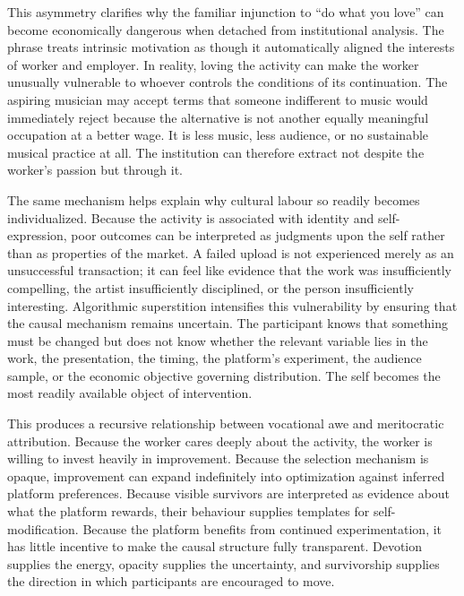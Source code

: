 \documentclass[11pt]{article}
\begin{document}
This asymmetry clarifies why the familiar injunction to ``do what you love'' can become economically dangerous when detached from institutional analysis. The phrase treats intrinsic motivation as though it automatically aligned the interests of worker and employer. In reality, loving the activity can make the worker unusually vulnerable to whoever controls the conditions of its continuation. The aspiring musician may accept terms that someone indifferent to music would immediately reject because the alternative is not another equally meaningful occupation at a better wage. It is less music, less audience, or no sustainable musical practice at all. The institution can therefore extract not despite the worker's passion but through it.

The same mechanism helps explain why cultural labour so readily becomes individualized. Because the activity is associated with identity and self-expression, poor outcomes can be interpreted as judgments upon the self rather than as properties of the market. A failed upload is not experienced merely as an unsuccessful transaction; it can feel like evidence that the work was insufficiently compelling, the artist insufficiently disciplined, or the person insufficiently interesting. Algorithmic superstition intensifies this vulnerability by ensuring that the causal mechanism remains uncertain. The participant knows that something must be changed but does not know whether the relevant variable lies in the work, the presentation, the timing, the platform's experiment, the audience sample, or the economic objective governing distribution. The self becomes the most readily available object of intervention.

This produces a recursive relationship between vocational awe and meritocratic attribution. Because the worker cares deeply about the activity, the worker is willing to invest heavily in improvement. Because the selection mechanism is opaque, improvement can expand indefinitely into optimization against inferred platform preferences. Because visible survivors are interpreted as evidence about what the platform rewards, their behaviour supplies templates for self-modification. Because the platform benefits from continued experimentation, it has little incentive to make the causal structure fully transparent. Devotion supplies the energy, opacity supplies the uncertainty, and survivorship supplies the direction in which participants are encouraged to move.
\end{document}
